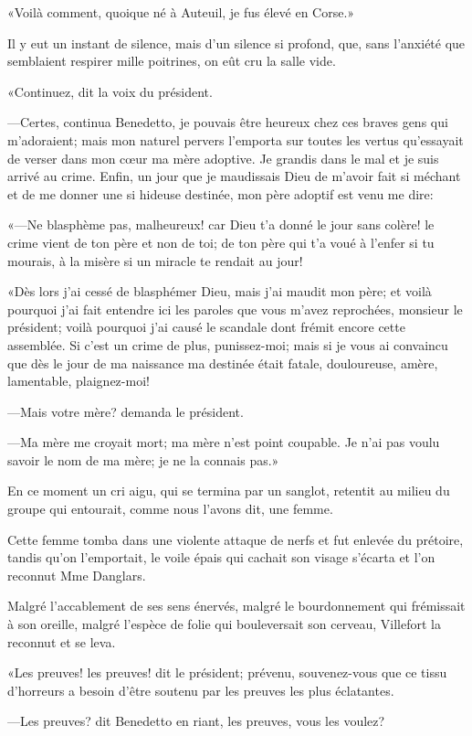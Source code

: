 «Voilà comment, quoique né à Auteuil, je fus élevé en Corse.» 

Il y eut un instant de silence, mais d'un silence si profond, que, sans l'anxiété que semblaient respirer mille poitrines, on eût cru la salle vide. 

«Continuez, dit la voix du président. 

—Certes, continua Benedetto, je pouvais être heureux chez ces braves gens qui m'adoraient; mais mon naturel pervers l'emporta sur toutes les vertus qu'essayait de verser dans mon cœur ma mère adoptive. Je grandis dans le mal et je suis arrivé au crime. Enfin, un jour que je maudissais Dieu de m'avoir fait si méchant et de me donner une si hideuse destinée, mon père adoptif est venu me dire: 

«—Ne blasphème pas, malheureux! car Dieu t'a donné le jour sans colère! le crime vient de ton père et non de toi; de ton père qui t'a voué à l'enfer si tu mourais, à la misère si un miracle te rendait au jour! 

«Dès lors j'ai cessé de blasphémer Dieu, mais j'ai maudit mon père; et voilà pourquoi j'ai fait entendre ici les paroles que vous m'avez reprochées, monsieur le président; voilà pourquoi j'ai causé le scandale dont frémit encore cette assemblée. Si c'est un crime de plus, punissez-moi; mais si je vous ai convaincu que dès le jour de ma naissance ma destinée était fatale, douloureuse, amère, lamentable, plaignez-moi! 

—Mais votre mère? demanda le président. 

—Ma mère me croyait mort; ma mère n'est point coupable. Je n'ai pas voulu savoir le nom de ma mère; je ne la connais pas.» 

En ce moment un cri aigu, qui se termina par un sanglot, retentit au milieu du groupe qui entourait, comme nous l'avons dit, une femme. 

Cette femme tomba dans une violente attaque de nerfs et fut enlevée du prétoire, tandis qu'on l'emportait, le voile épais qui cachait son visage s'écarta et l'on reconnut Mme Danglars. 

Malgré l'accablement de ses sens énervés, malgré le bourdonnement qui frémissait à son oreille, malgré l'espèce de folie qui bouleversait son cerveau, Villefort la reconnut et se leva. 

«Les preuves! les preuves! dit le président; prévenu, souvenez-vous que ce tissu d'horreurs a besoin d'être soutenu par les preuves les plus éclatantes. 

—Les preuves? dit Benedetto en riant, les preuves, vous les voulez? 


